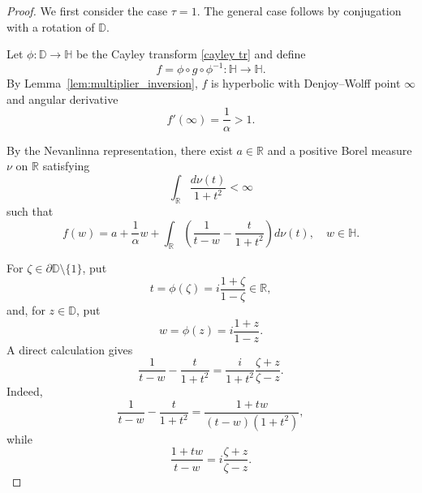 \documentclass[12pt]{amsart}
\numberwithin{equation}{section}
\theoremstyle{plain}
\theoremstyle{definition}
\begin{document}
\begin{proof}
We first consider the case $\tau=1$. The general case follows by
conjugation with a rotation of $\mathbb{D}$.

Let $\phi:\mathbb{D}\to\mathbb{H}$ be the Cayley transform \eqref{cayley tr}
and define
\begin{equation*}
f=\phi\circ g\circ\phi^{-1}:\mathbb{H}\to\mathbb{H}.
\end{equation*}
By Lemma~\ref{lem:multiplier_inversion}, $f$ is hyperbolic with
Denjoy--Wolff point $\infty$ and angular derivative
\begin{equation*}
f'(\infty)=\frac{1}{\alpha}>1.
\end{equation*}

By the Nevanlinna representation, there exist $a\in\mathbb{R}$ and a
positive Borel measure $\nu$ on $\mathbb{R}$ satisfying
\begin{equation*}
\int_{\mathbb{R}}\frac{d\nu(t)}{1+t^2}<\infty
\end{equation*}
such that
\begin{equation}
\label{eq:f_rep}
f(w)
=
a+\frac{1}{\alpha}w
+\int_{\mathbb{R}}
\left(
\frac{1}{t-w}-\frac{t}{1+t^2}
\right)d\nu(t),
\quad w\in\mathbb{H}.
\end{equation}

For $\zeta\in\partial\mathbb{D}\setminus\{1\}$, put
\begin{equation*}
t=\phi(\zeta)
=i\frac{1+\zeta}{1-\zeta}\in\mathbb{R},
\end{equation*}
and, for $z\in\mathbb{D}$, put
\begin{equation*}
w=\phi(z)=i\frac{1+z}{1-z}.
\end{equation*}
A direct calculation gives
\begin{equation}
\label{eq:kernel_id}
\frac{1}{t-w}-\frac{t}{1+t^2}
=
\frac{i}{1+t^2}\frac{\zeta+z}{\zeta-z}.
\end{equation}
Indeed,
\begin{equation*}
\frac{1}{t-w}-\frac{t}{1+t^2}
=
\frac{1+tw}{(t-w)(1+t^2)},
\end{equation*}
while
\begin{equation*}
\frac{1+tw}{t-w}
=
i\frac{\zeta+z}{\zeta-z}.
\end{equation*}


\end{proof}
\end{document}
